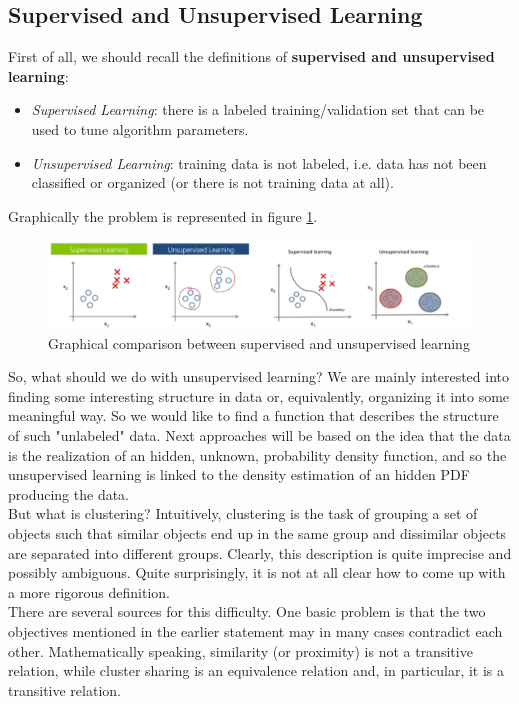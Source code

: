 \documentclass[12pt]{report}
\theoremstyle{plain}
\begin{document}
\begin{flushleft}
\section{Supervised and Unsupervised Learning}
First of all, we should recall the definitions of \textbf{supervised and unsupervised learning}:
\begin{itemize}
	\item \textit{Supervised Learning}: there is a labeled training/validation set that can be used to tune algorithm parameters.
	\item \textit{Unsupervised Learning}: training data is not labeled, i.e. data has not been classified or organized (or there is not training data at all).
\end{itemize}
Graphically the problem is represented in figure \ref{fig:clus_supunsup_learn}.\\
\begin{figure}[!h]
	\centering
	\includegraphics[scale=0.75]{images/clus_supunsup_learn.pdf}
	\caption{Graphical comparison between supervised and unsupervised learning}
	\label{fig:clus_supunsup_learn}
\end{figure}
So, what should we do with unsupervised learning? We are mainly interested into finding some interesting structure in data or, equivalently, organizing it into some meaningful way. So we would like to find a function that describes the structure of such "unlabeled" data. Next approaches will be based on the idea that the data is the realization of an hidden, unknown, probability density function, and so the unsupervised learning is linked to the density
estimation of an hidden PDF producing the data.\\
But what is clustering? Intuitively, clustering is the task of grouping a set of objects such that similar objects end up in the same group and dissimilar objects are separated into different groups. Clearly, this description is quite imprecise and possibly ambiguous. Quite surprisingly, it is not at all clear how to come up with a more rigorous definition.\\
There are several sources for this difficulty. One basic problem is that the two objectives mentioned in the earlier statement may in many cases contradict each other. Mathematically speaking, similarity (or proximity) is not a transitive relation, while cluster sharing is an equivalence relation and, in particular, it is a transitive relation. 

\end{flushleft}
\end{document}
